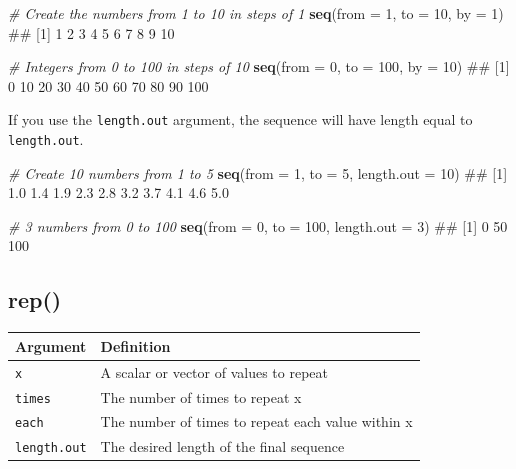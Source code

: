 \documentclass[]{book}
\newenvironment{Shaded}{\begin{snugshade}}{\end{snugshade}}
\newcommand{\KeywordTok}[1]{\textcolor[rgb]{0.13,0.29,0.53}{\textbf{#1}}}
\newcommand{\DataTypeTok}[1]{\textcolor[rgb]{0.13,0.29,0.53}{#1}}
\newcommand{\DecValTok}[1]{\textcolor[rgb]{0.00,0.00,0.81}{#1}}
\newcommand{\CommentTok}[1]{\textcolor[rgb]{0.56,0.35,0.01}{\textit{#1}}}
\newcommand{\NormalTok}[1]{#1}
\theoremstyle{definition}
\theoremstyle{definition}
\theoremstyle{remark}
\begin{document}
\begin{Shaded}
\begin{Highlighting}[]
\CommentTok{# Create the numbers from 1 to 10 in steps of 1}
\KeywordTok{seq}\NormalTok{(}\DataTypeTok{from =} \DecValTok{1}\NormalTok{, }\DataTypeTok{to =} \DecValTok{10}\NormalTok{, }\DataTypeTok{by =} \DecValTok{1}\NormalTok{)}
\NormalTok{##  [1]  1  2  3  4  5  6  7  8  9 10}

\CommentTok{# Integers from 0 to 100 in steps of 10}
\KeywordTok{seq}\NormalTok{(}\DataTypeTok{from =} \DecValTok{0}\NormalTok{, }\DataTypeTok{to =} \DecValTok{100}\NormalTok{, }\DataTypeTok{by =} \DecValTok{10}\NormalTok{)}
\NormalTok{##  [1]   0  10  20  30  40  50  60  70  80  90 100}
\end{Highlighting}
\end{Shaded}

If you use the \texttt{length.out} argument, the sequence will have
length equal to \texttt{length.out}.

\begin{Shaded}
\begin{Highlighting}[]
\CommentTok{# Create 10 numbers from 1 to 5}
\KeywordTok{seq}\NormalTok{(}\DataTypeTok{from =} \DecValTok{1}\NormalTok{, }\DataTypeTok{to =} \DecValTok{5}\NormalTok{, }\DataTypeTok{length.out =} \DecValTok{10}\NormalTok{)}
\NormalTok{##  [1] 1.0 1.4 1.9 2.3 2.8 3.2 3.7 4.1 4.6 5.0}

\CommentTok{# 3 numbers from 0 to 100}
\KeywordTok{seq}\NormalTok{(}\DataTypeTok{from =} \DecValTok{0}\NormalTok{, }\DataTypeTok{to =} \DecValTok{100}\NormalTok{, }\DataTypeTok{length.out =} \DecValTok{3}\NormalTok{)}
\NormalTok{## [1]   0  50 100}
\end{Highlighting}
\end{Shaded}

\subsection{rep()}\label{rep}

\begin{longtable}[]{@{}ll@{}}
\toprule
Argument & Definition\tabularnewline
\midrule
\endhead
\texttt{x} & A scalar or vector of values to repeat\tabularnewline
\texttt{times} & The number of times to repeat x\tabularnewline
\texttt{each} & The number of times to repeat each value within
x\tabularnewline
\texttt{length.out} & The desired length of the final
sequence\tabularnewline
\bottomrule
\end{longtable}
\end{document}

